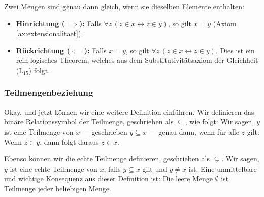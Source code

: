 \begin{math-stroke}
Zwei Mengen sind genau dann gleich, wenn sie dieselben Elemente enthalten:
\begin{itemize}
    \item \textbf{Hinrichtung ($\implies$):} Falls $\forall z \, (z \in x \leftrightarrow z \in y)$, so gilt $x = y$ (Axiom \ref{ax:extensionalitaet}).
    \item \textbf{Rückrichtung ($\impliedby$):} Falls $x = y$, so gilt $\forall z \, (z \in x \leftrightarrow z \in y)$. Dies ist ein rein logisches Theorem, welches aus dem Substitutivitätsaxiom der Gleichheit ($\text{L}_{15}$) folgt.
\end{itemize}

\end{math-stroke}

\subsubsection{Teilmengenbeziehung}
\begin{spoken-clean}[01:24:10 - 01:26:22]
Okay, und jetzt können wir eine weitere Definition einführen. Wir definieren das binäre Relationssymbol der Teilmenge, geschrieben als $\subseteq$, wie folgt: Wir sagen, $y$ ist eine Teilmenge von $x$ --- geschrieben $y \subseteq x$ --- genau dann, wenn für alle $z$ gilt: Wenn $z \in y$, dann folgt daraus $z \in x$.

Ebenso können wir die echte Teilmenge definieren, geschrieben als $\subsetneq$. Wir sagen, $y$ ist eine echte Teilmenge von $x$, falls $y \subseteq x$ gilt und $y \neq x$ ist. Eine unmittelbare und wichtige Konsequenz aus dieser Definition ist: Die leere Menge $\emptyset$ ist Teilmenge jeder beliebigen Menge.
\end{spoken-clean}

